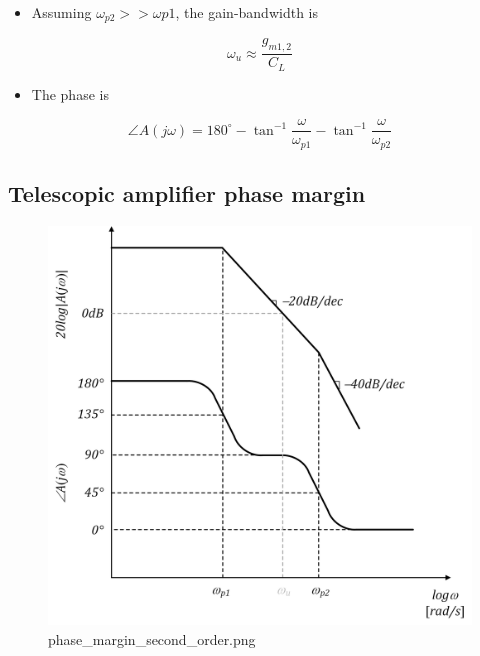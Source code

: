 \documentclass[11pt]{article}
\providecommand{\tightlist}{%
      \setlength{\itemsep}{0pt}\setlength{\parskip}{0pt}}
\begin{document}
\begin{itemize}
\tightlist
\item
  Assuming \(\omega_{p2} >> \omega{p1}\), the gain-bandwidth is
\end{itemize}

\begin{equation}
\omega_u \approx \dfrac{g_{m1,2}}{C_L}
\end{equation}

\begin{itemize}
\tightlist
\item
  The phase is
\end{itemize}

\begin{equation}
\angle A(j\omega) = 180^{\circ} - \tan^{-1}\dfrac{\omega}{\omega_{p1}} - \tan^{-1}\dfrac{\omega}{\omega_{p2}}
\end{equation}

    \hypertarget{telescopic-amplifier-phase-margin}{%
\subsection{Telescopic amplifier phase
margin}\label{telescopic-amplifier-phase-margin}}

    \begin{figure}
\centering
\includegraphics{phase_margin_second_order.png}
\caption{phase\_margin\_second\_order.png}
\end{figure}
\end{document}
